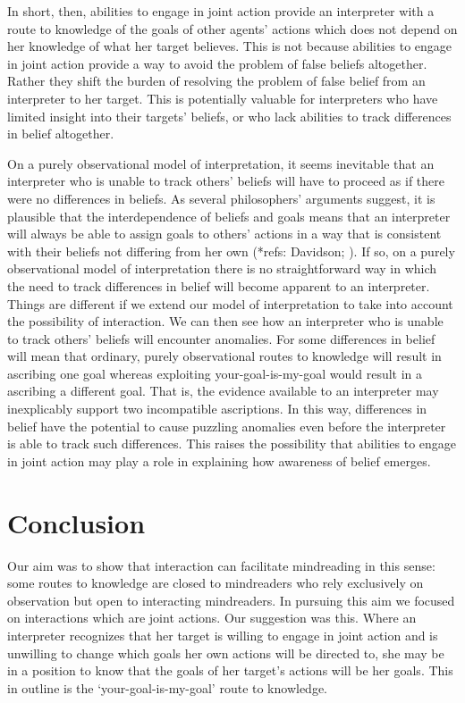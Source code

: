 \documentclass[14pt,a4paper]{extarticle}
\begin{document}
In short, then, abilities to engage in joint action provide an interpreter with a route to knowledge of the goals of other agents' actions which does not depend on her knowledge of what her target believes.
This is not because abilities to engage in joint action provide a way to avoid the problem of false beliefs altogether.
Rather they shift the burden of resolving the problem of false belief from an interpreter to her target.
This is potentially valuable for interpreters who have limited insight into their targets' beliefs,
or who lack abilities to track differences in belief altogether.

On a purely observational model of interpretation,
it seems inevitable that an interpreter who is unable to track others' beliefs 
will have to proceed as if there were no differences in beliefs.
As several philosophers' arguments suggest,
it is plausible that 
the interdependence of beliefs and goals 
means that
an interpreter will always be able to assign goals to others' actions 
in a way that is consistent with their beliefs not differing from her own
(*refs: Davidson; \citealp[p.\ 49]{Bennett:1976rg}).
If so,
on a purely observational model of interpretation
there is no straightforward way in which
the need to track differences in belief 
will become apparent to an interpreter.
Things are different
if we extend our model of interpretation
to take into account the possibility of interaction.
We can then see how
an interpreter who is unable to track others' beliefs
will encounter anomalies.
For some differences in belief will mean that
 ordinary, purely observational routes to knowledge will result in ascribing one goal
 whereas
 exploiting your-goal-is-my-goal would result in a ascribing a different goal.
That is, the evidence available to an interpreter may inexplicably support two incompatible ascriptions. 
In this way,
differences in belief have the potential to cause puzzling anomalies
even before the interpreter is able to track such differences.
This 
raises the possibility
that abilities to engage in joint action
may play a role in explaining how  awareness of belief emerges.




\section{Conclusion}
Our aim was to show that interaction can facilitate mindreading in this sense:
some routes to knowledge are closed to mindreaders who rely exclusively on observation
but
open to interacting mindreaders.
In pursuing this aim we focused on interactions which are joint actions.
Our suggestion was this.
Where an interpreter recognizes that her target is willing to engage in joint action
and is unwilling to change which goals her own actions will be directed to,
she may be in a position to know
that the goals of her target's actions will be her goals.
This in outline is the `your-goal-is-my-goal' route to knowledge.
\end{document}
